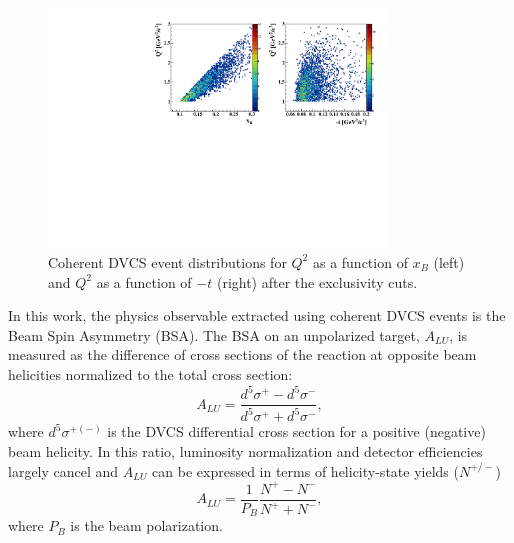 \documentclass[twocolumn,nofootinbib,showpacs,prl,superscriptaddress,secnumarabic,amssymb,nobibnotes,aps,floatfix]{revtex4}
\begin{document}
\begin{figure}[tb]
\hspace{-0.45cm}
\includegraphics[width=9.0cm]{figs/Q2_xB_t_Coh.pdf}
\caption{Coherent DVCS event distributions for $Q^{2}$ as a function of 
$x_{B}$ (left) and $Q^{2}$ as a function of $-t$ (right) after the 
exclusivity cuts.}
\label{fig:kin-coverage}
\end{figure}

In this work, the physics observable extracted using coherent DVCS events is
the Beam Spin Asymmetry (BSA). The BSA on an unpolarized target, $A_{LU}$, is 
measured as the difference of cross sections of the reaction at opposite beam 
helicities normalized to the total cross section:
  \begin{equation}
  A_{LU} = \frac{d^{5}\sigma^{+} - d^{5}\sigma^{-} }
                {d^{5}\sigma^{+} + d^{5}\sigma^{-}},
    \label{BSA_equation}
  \end{equation}
where $d^{5}\sigma^{+(-)}$ is the DVCS differential cross 
section for a positive (negative) beam helicity. 
In this ratio, luminosity normalization and
detector efficiencies largely cancel and $A_{LU}$ can be expressed in
terms of helicity-state yields ($N^{+/-}$)
\begin{equation}
A_{LU} = \frac{1}{P_{B}} \frac{N^{+} - N^{-}}{N^{+} + N^{-} },
\end{equation}
where $P_{B}$ is the beam polarization.
\end{document}
